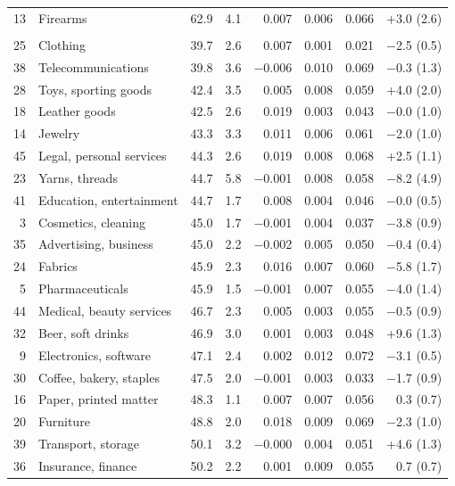 {\begin{longtable}{r>{\raggedright\arraybackslash}p{3.6cm}rrrrrr}
13 & Firearms & 62.9 & 4.1 & 0.007 & 0.006 & 0.066 & +3.0 (2.6) \\
\addlinespace\multicolumn{8}{l}{\textbf{Cluster 4: low survival} (28 classes; pooled lead effect $-$1.2, s.e.\ 0.16)} \\
25 & Clothing & 39.7 & 2.6 & 0.007 & 0.001 & 0.021 & $-$2.5 (0.5) \\
38 & Telecommunications & 39.8 & 3.6 & $-$0.006 & 0.010 & 0.069 & $-$0.3 (1.3) \\
28 & Toys, sporting goods & 42.4 & 3.5 & 0.005 & 0.008 & 0.059 & +4.0 (2.0) \\
18 & Leather goods & 42.5 & 2.6 & 0.019 & 0.003 & 0.043 & $-$0.0 (1.0) \\
14 & Jewelry & 43.3 & 3.3 & 0.011 & 0.006 & 0.061 & $-$2.0 (1.0) \\
45 & Legal, personal services & 44.3 & 2.6 & 0.019 & 0.008 & 0.068 & +2.5 (1.1) \\
23 & Yarns, threads & 44.7 & 5.8 & $-$0.001 & 0.008 & 0.058 & $-$8.2 (4.9) \\
41 & Education, entertainment & 44.7 & 1.7 & 0.008 & 0.004 & 0.046 & $-$0.0 (0.5) \\
3 & Cosmetics, cleaning & 45.0 & 1.7 & $-$0.001 & 0.004 & 0.037 & $-$3.8 (0.9) \\
35 & Advertising, business & 45.0 & 2.2 & $-$0.002 & 0.005 & 0.050 & $-$0.4 (0.4) \\
24 & Fabrics & 45.9 & 2.3 & 0.016 & 0.007 & 0.060 & $-$5.8 (1.7) \\
5 & Pharmaceuticals & 45.9 & 1.5 & $-$0.001 & 0.007 & 0.055 & $-$4.0 (1.4) \\
44 & Medical, beauty services & 46.7 & 2.3 & 0.005 & 0.003 & 0.055 & $-$0.5 (0.9) \\
32 & Beer, soft drinks & 46.9 & 3.0 & 0.001 & 0.003 & 0.048 & +9.6 (1.3) \\
9 & Electronics, software & 47.1 & 2.4 & 0.002 & 0.012 & 0.072 & $-$3.1 (0.5) \\
30 & Coffee, bakery, staples & 47.5 & 2.0 & $-$0.001 & 0.003 & 0.033 & $-$1.7 (0.9) \\
16 & Paper, printed matter & 48.3 & 1.1 & 0.007 & 0.007 & 0.056 & 0.3 (0.7) \\
20 & Furniture & 48.8 & 2.0 & 0.018 & 0.009 & 0.069 & $-$2.3 (1.0) \\
39 & Transport, storage & 50.1 & 3.2 & $-$0.000 & 0.004 & 0.051 & +4.6 (1.3) \\
36 & Insurance, finance & 50.2 & 2.2 & 0.001 & 0.009 & 0.055 & 0.7 (0.7) \\

\end{longtable}}
